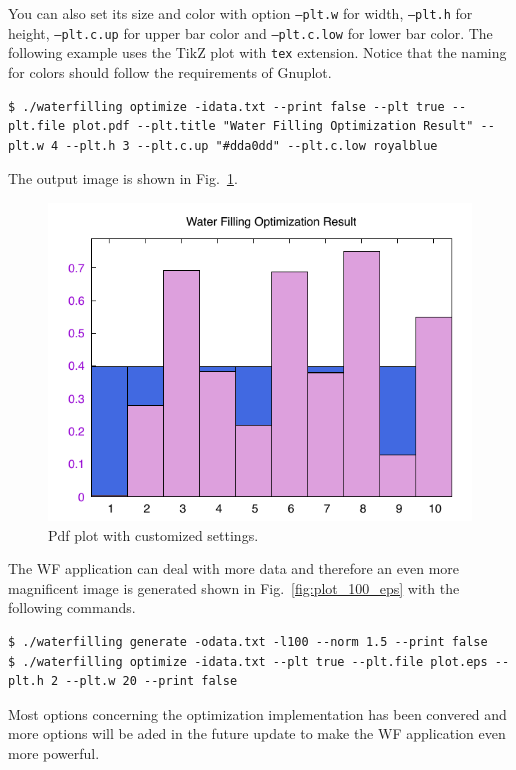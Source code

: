 \documentclass[journal,twoside]{IEEEtran}
\begin{document}
    You can also set its size and color with option \texttt{---plt.w} for width, \texttt{---plt.h} for height, \texttt{---plt.c.up} for upper bar color and \texttt{---plt.c.low} for lower bar color. The following example uses the TikZ plot with \texttt{tex} extension.
    Notice that the naming for colors should follow the requirements of Gnuplot.
    \begin{lstlisting}[morekeywords={\$}]
$ ./waterfilling optimize -idata.txt --print false --plt true --plt.file plot.pdf --plt.title "Water Filling Optimization Result" --plt.w 4 --plt.h 3 --plt.c.up "#dda0dd" --plt.c.low royalblue
    \end{lstlisting}
    The output image is shown in Fig.~\ref{fig:plot_10_pdf}.
    \begin{figure}[htbp]
      \centering
      \includegraphics[width=\linewidth]{fig/plot_10.pdf}
      \caption{Pdf plot with customized settings.}
      \label{fig:plot_10_pdf}
    \end{figure}

    The WF application can deal with more data and therefore an even more magnificent image  is generated shown in Fig.~\ref{fig:plot_100_eps} with the following commands.
    \begin{lstlisting}[morekeywords={\$}]
$ ./waterfilling generate -odata.txt -l100 --norm 1.5 --print false
$ ./waterfilling optimize -idata.txt --plt true --plt.file plot.eps --plt.h 2 --plt.w 20 --print false
    \end{lstlisting}

    Most options concerning the optimization implementation has been convered and more options will be aded in the future update to make the WF application even more powerful.
\end{document}
